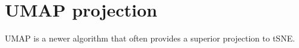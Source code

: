 \section{UMAP projection}

UMAP is a newer algorithm that often provides a superior projection to tSNE.



\clearpage
